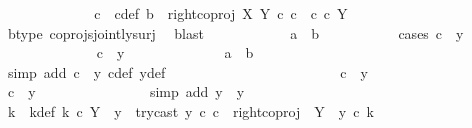 \begin{isabellebody}
\ \ \ \ \ \ \ \ \ \ \isamarkupfalse%
\ \isamarkupfalse%
\ c\ \ c{\isacharunderscore}{\kern0pt}def{\isacharcolon}{\kern0pt}\ {\isachardoublequoteopen}b\ {\isacharequal}{\kern0pt}\ right{\isacharunderscore}{\kern0pt}coproj\ X\ Y\ {\isasymcirc}\isactrlsub c\ c\ {\isasymand}\ c\ {\isasymin}\isactrlsub c\ Y{\isachardoublequoteclose}\isanewline
\ \ \ \ \ \ \ \ \ \ \ \ \isamarkupfalse%
\ b{\isacharunderscore}{\kern0pt}type\ coprojs{\isacharunderscore}{\kern0pt}jointly{\isacharunderscore}{\kern0pt}surj\ \isamarkupfalse%
\ blast\isanewline
\ \ \ \ \ \ \ \ \ \ \isamarkupfalse%
\ {\isachardoublequoteopen}a\ {\isacharequal}{\kern0pt}\ b{\isachardoublequoteclose}\isanewline
\ \ \ \ \ \ \ \ \ \ \isamarkupfalse%
{\isacharparenleft}{\kern0pt}cases\ {\isachardoublequoteopen}c\ {\isacharequal}{\kern0pt}\ y{\isachardoublequoteclose}{\isacharparenright}{\kern0pt}\isanewline
\ \ \ \ \ \ \ \ \ \ \ \ \isamarkupfalse%
\ {\isachardoublequoteopen}c\ {\isacharequal}{\kern0pt}\ y{\isachardoublequoteclose}\isanewline
\ \ \ \ \ \ \ \ \ \ \ \ \isamarkupfalse%
\ {\isachardoublequoteopen}a\ {\isacharequal}{\kern0pt}\ b{\isachardoublequoteclose}\isanewline
\ \ \ \ \ \ \ \ \ \ \ \ \ \ \isamarkupfalse%
\ {\isacharparenleft}{\kern0pt}simp\ add{\isacharcolon}{\kern0pt}\ {\isacartoucheopen}c\ {\isacharequal}{\kern0pt}\ y{\isacartoucheclose}\ c{\isacharunderscore}{\kern0pt}def\ y{\isacharunderscore}{\kern0pt}def{\isacharparenright}{\kern0pt}\isanewline
\ \ \ \ \ \ \ \ \ \ \isamarkupfalse%
\isanewline
\ \ \ \ \ \ \ \ \ \ \ \ \isamarkupfalse%
\ {\isachardoublequoteopen}c\ {\isasymnoteq}\ y{\isachardoublequoteclose}\isanewline
\ \ \ \ \ \ \ \ \ \ \ \ \isamarkupfalse%
\ \isamarkupfalse%
\ {\isachardoublequoteopen}c\ {\isasymnoteq}\ y{}{\isachardoublequoteclose}\isanewline
\ \ \ \ \ \ \ \ \ \ \ \ \ \ \isamarkupfalse%
\ {\isacharparenleft}{\kern0pt}simp\ add{\isacharcolon}{\kern0pt}\ {\isacartoucheopen}y\ {\isacharequal}{\kern0pt}\ y{}{\isacartoucheclose}{\isacharparenright}{\kern0pt}\isanewline
\ \ \ \ \ \ \ \ \ \ \ \ \isamarkupfalse%
\ \isamarkupfalse%
\ k\ \ k{\isacharunderscore}{\kern0pt}def{\isacharcolon}{\kern0pt}\ {\isachardoublequoteopen}k\ {\isasymin}\isactrlsub c\ Y\ {\isasymsetminus}\ {\isacharparenleft}{\kern0pt}{\isasymone}{\isacharcomma}{\kern0pt}y{}{\isacharparenright}{\kern0pt}\ {\isasymand}\ try{\isacharunderscore}{\kern0pt}cast\ y{}\ {\isasymcirc}\isactrlsub c\ c\ {\isacharequal}{\kern0pt}\ right{\isacharunderscore}{\kern0pt}coproj\ {\isasymone}\ {\isacharparenleft}{\kern0pt}Y\ {\isasymsetminus}\ {\isacharparenleft}{\kern0pt}{\isasymone}{\isacharcomma}{\kern0pt}y{}{\isacharparenright}{\kern0pt}{\isacharparenright}{\kern0pt}\ {\isasymcirc}\isactrlsub c\ k\ {\isasymand}\ \isanewline

\end{isabellebody}
